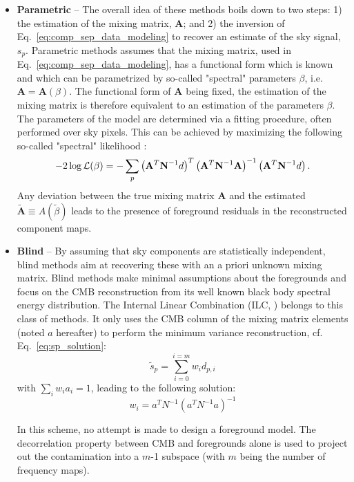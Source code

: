 \begin{itemize}
	\item \textbf{Parametric} -- The overall idea of these methods boils down to two steps: 1) the estimation of the mixing matrix, $\mathbf{A}$; and 2) the inversion of Eq.~\ref{eq:comp_sep_data_modeling} to recover an estimate of the sky signal, $s_p$.
	Parametric methods assumes that the mixing matrix, used in Eq.~\ref{eq:comp_sep_data_modeling}, has a functional form which is known and which can be parametrized by so-called "spectral" parameters $\beta$, i.e. $\mathbf{A} = \mathbf{A}(\beta)$. The functional form of $\mathbf{A}$ being fixed, the estimation of the mixing matrix is therefore equivalent to an estimation of the parameters $\beta$. The parameters of the model are determined via a fitting procedure, often performed over sky pixels. This can be achieved by maximizing the following so-called "spectral" likelihood \cite{brandt94,eriksen06}:
	\begin{eqnarray}
		\centering
			-2\log \mathcal{L}(\beta) = - \sum_p \left( \mathbf{A}^T\mathbf{N}^{-1} d\right)^T\left( \mathbf{A}^T\mathbf{N}^{-1} \mathbf{A}\right)^{-1}\left( \mathbf{A}^T\mathbf{N}^{-1} d\right).
	\end{eqnarray}
Any deviation between the true mixing matrix $\mathbf{A}$ and the estimated $\mathbf{\tilde A} \equiv A(\tilde \beta)$ leads to the presence of foreground residuals in the reconstructed component maps.
	\item \textbf{Blind} -- By assuming that sky components are statistically independent, blind methods aim at recovering these with an a priori unknown mixing matrix. Blind methods make minimal assumptions about the foregrounds and focus on the CMB reconstruction from its well known black body spectral energy distribution. The Internal Linear Combination (ILC, \cite{tegmark03}) belongs to this class of methods. It only uses the CMB column of the mixing matrix elements (noted $a$ hereafter) to perform the minimum variance reconstruction, cf. Eq.~\ref{eq:sp_solution}:
\begin{equation}
  \tilde s_p = \sum_{i=0}^{i=m} w_i d_{p,i}
\end{equation}
with $\sum_i  w_i a_i = 1$, leading to the following solution:
\begin{equation}
  w_i = a^T N^{-1} (a^TN^{-1} a)^{-1}
\end{equation}

In this scheme, no attempt is made to design a foreground model. The decorrelation property between CMB and foregrounds alone is used to project out the contamination into a $m$-1 subspace (with $m$ being the number of frequency maps).


\end{itemize}
